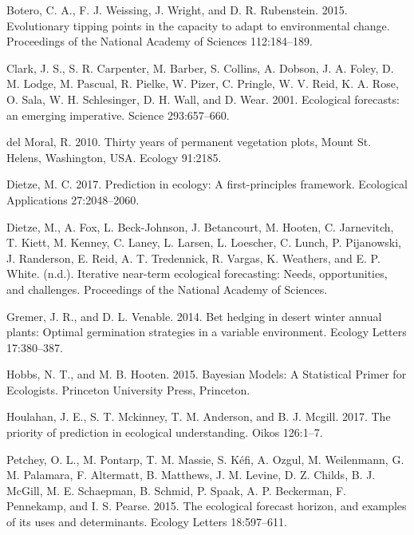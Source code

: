 \documentclass[12pt,]{article}
\begin{document}
\leavevmode\hypertarget{ref-Botero2015}{}%
Botero, C. A., F. J. Weissing, J. Wright, and D. R. Rubenstein. 2015.
Evolutionary tipping points in the capacity to adapt to environmental
change. Proceedings of the National Academy of Sciences 112:184--189.

\leavevmode\hypertarget{ref-Clark2001}{}%
Clark, J. S., S. R. Carpenter, M. Barber, S. Collins, A. Dobson, J. A.
Foley, D. M. Lodge, M. Pascual, R. Pielke, W. Pizer, C. Pringle, W. V.
Reid, K. A. Rose, O. Sala, W. H. Schlesinger, D. H. Wall, and D. Wear.
2001. Ecological forecasts: an emerging imperative. Science
293:657--660.

\leavevmode\hypertarget{ref-DelMoral2010}{}%
del Moral, R. 2010. Thirty years of permanent vegetation plots, Mount
St. Helens, Washington, USA. Ecology 91:2185.

\leavevmode\hypertarget{ref-Dietze2017a}{}%
Dietze, M. C. 2017. Prediction in ecology: A first-principles framework.
Ecological Applications 27:2048--2060.

\leavevmode\hypertarget{ref-Dietze2018}{}%
Dietze, M., A. Fox, L. Beck-Johnson, J. Betancourt, M. Hooten, C.
Jarnevitch, T. Kiett, M. Kenney, C. Laney, L. Larsen, L. Loescher, C.
Lunch, P. Pijanowski, J. Randerson, E. Reid, A. T. Tredennick, R.
Vargas, K. Weathers, and E. P. White. (n.d.). Iterative near-term
ecological forecasting: Needs, opportunities, and challenges.
Proceedings of the National Academy of Sciences.

\leavevmode\hypertarget{ref-Gremer2014}{}%
Gremer, J. R., and D. L. Venable. 2014. Bet hedging in desert winter
annual plants: Optimal germination strategies in a variable environment.
Ecology Letters 17:380--387.

\leavevmode\hypertarget{ref-Hobbs2015}{}%
Hobbs, N. T., and M. B. Hooten. 2015. Bayesian Models: A Statistical
Primer for Ecologists. Princeton University Press, Princeton.

\leavevmode\hypertarget{ref-Houlahan2017}{}%
Houlahan, J. E., S. T. Mckinney, T. M. Anderson, and B. J. Mcgill. 2017.
The priority of prediction in ecological understanding. Oikos 126:1--7.

\leavevmode\hypertarget{ref-Petchey2015}{}%
Petchey, O. L., M. Pontarp, T. M. Massie, S. Kéfi, A. Ozgul, M.
Weilenmann, G. M. Palamara, F. Altermatt, B. Matthews, J. M. Levine, D.
Z. Childs, B. J. McGill, M. E. Schaepman, B. Schmid, P. Spaak, A. P.
Beckerman, F. Pennekamp, and I. S. Pearse. 2015. The ecological forecast
horizon, and examples of its uses and determinants. Ecology Letters
18:597--611.
\end{document}
